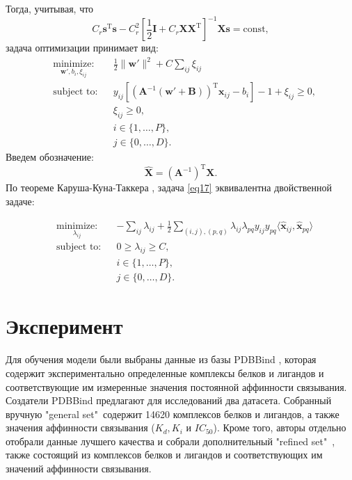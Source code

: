 \documentclass[preprint,12pt,3p]{elsarticle}
\begin{document}
Тогда, учитывая, что 
\begin{equation*}
C_r\mathbf{s}^{\text{T}}\mathbf{s}-C_r^2\left[\frac{1}{2}\mathbf{I} + C_{r}{\mathbf{X}}{\mathbf{X}}^{\text{T}}\right]^{-1}{\mathbf{X}}\mathbf{s}=\text{const},
\end{equation*}
задача оптимизации принимает вид: 
\begin{equation}\label{eq17}
\begin{aligned}
& \underset{\mathbf{w}', b_i, \xi_{ij}}{\text{minimize:}}
& & \frac{1}{2} \|\mathbf{w}'\|^2 + C\sum\limits_{ij}\xi_{ij} \\
& \text{subject to:}
& & y_{ij}[\left(\mathbf{A}^{-1}\left(\mathbf{w}'+\mathbf{B}\right)\right)^{\text{T}}\mathbf{x}_{ij} - b_i]-1+\xi_{ij} \geq 0, \\
&&& \xi_{ij} \geq 0, \\
&&&i\in\{1,\dots,P\}, \\
&&&j\in\{0,\dots,D\}.
\end{aligned}
\end{equation}
Введем обозначение:
\begin{equation}\label{eq18}
\hat{\mathbf{X}} = (\mathbf{A}^{-1})^{\text{T}}\mathbf{X}.
\end{equation}
По теореме Каруша-Куна-Таккера \cite{convex_optimization}, задача \eqref{eq17} эквивалентна двойственной задаче:

\begin{equation}\label{eq19}
\begin{aligned}
& \underset{\lambda_{ij}}{\text{minimize:}}
& & -\sum\limits_{ij}\lambda_{ij} + \frac{1}{2}\sum\limits_{(i,j),(p,q)}\lambda_{ij}\lambda_{pq}y_{ij}y_{pq}\langle\hat{\mathbf{x}}_{ij},\hat{\mathbf{x}}_{pq}\rangle \\
& \text{subject to:}
& & 0\geq\lambda_{ij}\geq C, \\
&&&i\in\{1,\dots,P\}, \\
&&&j\in\{0,\dots,D\}.
\end{aligned}
\end{equation}

\section{Эксперимент}
Для обучения модели были выбраны данные из базы PDBBind \cite{PDB1,PDB2}, которая содержит экспериментально определенные комплексы белков и лигандов и соответствующие им измеренные значения постоянной аффинности связывания. Создатели PDBBind предлагают для исследований два датасета. Собранный вручную "general set"\ содержит 14620 комплексов белков и лигандов, а также значения аффинности связывания ($K_d, K_i$ и $IC_{50}$). Кроме того, авторы отдельно отобрали данные лучшего качества и собрали дополнительный "refined set"\ , также состоящий из комплексов белков и лигандов и соответствующих им значений аффинности связывания. 
\end{document}
